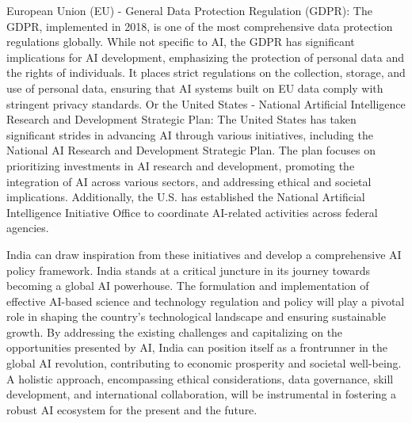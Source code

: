 \documentclass{report}
\begin{document}
European Union (EU) - General Data Protection Regulation (GDPR): The GDPR, implemented in 2018, 
is one of the most comprehensive data protection regulations globally. While not specific to AI, 
the GDPR has significant implications for AI development, emphasizing the protection of personal 
data and the rights of individuals. It places strict regulations on the collection, storage, and 
use of personal data, ensuring that AI systems built on EU data comply with stringent privacy standards. Or the
United States - National Artificial Intelligence Research and Development Strategic Plan: The United States has 
taken significant strides in advancing AI through various initiatives, including the National AI Research and 
Development Strategic Plan. The plan focuses on prioritizing investments in AI research and development, 
promoting the integration of AI across various sectors, and addressing ethical and societal implications. 
Additionally, the U.S. has established the National Artificial Intelligence Initiative Office to coordinate 
AI-related activities across federal agencies.

India can draw inspiration from these initiatives and develop a comprehensive AI policy framework.
India stands at a critical juncture in its journey towards becoming a global AI powerhouse. 
The formulation and implementation of effective AI-based science and technology regulation 
and policy will play a pivotal role in shaping the country's technological landscape and 
ensuring sustainable growth. By addressing the existing challenges and capitalizing on the 
opportunities presented by AI, India can position itself as a frontrunner in the global AI 
revolution, contributing to economic prosperity and societal well-being. A holistic approach, 
encompassing ethical considerations, data governance, skill development, and international 
collaboration, will be instrumental in fostering a robust AI ecosystem for the present and the future.
\end{document}
